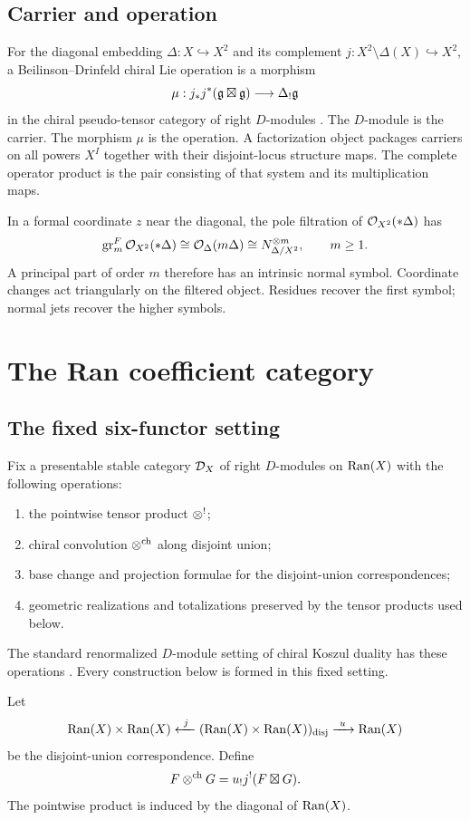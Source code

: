 \section{Carrier and operation}
For the diagonal embedding $\Delta:X\hookrightarrow X^2$ and its complement $j:X^2\setminus\Delta(X)\hookrightarrow X^2$, a Beilinson--Drinfeld chiral Lie operation is a morphism
\[
 \mu:j_*j^*(\mathfrak g\boxtimes\mathfrak g)\longrightarrow \Delta_!\mathfrak g
\]
in the chiral pseudo-tensor category of right $D$-modules \cite{BD04}. The $D$-module is the carrier. The morphism $\mu$ is the operation. A factorization object packages carriers on all powers $X^I$ together with their disjoint-locus structure maps. The complete operator product is the pair consisting of that system and its multiplication maps.

In a formal coordinate $z$ near the diagonal, the pole filtration of $\mathcal O_{X^2}(*\Delta)$ has
\[
 \operatorname{gr}_m^F\mathcal O_{X^2}(*\Delta)
 \cong \mathcal O_{\Delta}(m\Delta)
 \cong N_{\Delta/X^2}^{\otimes m},\qquad m\ge 1.
\]
A principal part of order $m$ therefore has an intrinsic normal symbol. Coordinate changes act triangularly on the filtered object. Residues recover the first symbol; normal jets recover the higher symbols.

\chapter{The Ran coefficient category}
\section{The fixed six-functor setting}
Fix a presentable stable category $\mathcal D_X$ of right $D$-modules on $\operatorname{Ran}(X)$ with the following operations:
\begin{enumerate}
\item the pointwise tensor product $\otimes^{!}$;
\item chiral convolution $\otimes^{\mathrm{ch}}$ along disjoint union;
\item base change and projection formulae for the disjoint-union correspondences;
\item geometric realizations and totalizations preserved by the tensor products used below.
\end{enumerate}
The standard renormalized $D$-module setting of chiral Koszul duality has these operations \cite{FG12}. Every construction below is formed in this fixed setting.

Let
\[
  \Ran(X)\times\Ran(X) \xleftarrow{\ j\ }
  (\Ran(X)\times\Ran(X))_{\mathrm{disj}}
  \xrightarrow{\ u\ }\Ran(X)
\]
be the disjoint-union correspondence. Define
\[
 F\otimes^{\mathrm{ch}}G=u_!j^!(F\boxtimes G).
\]
The pointwise product is induced by the diagonal of $\operatorname{Ran}(X)$.

